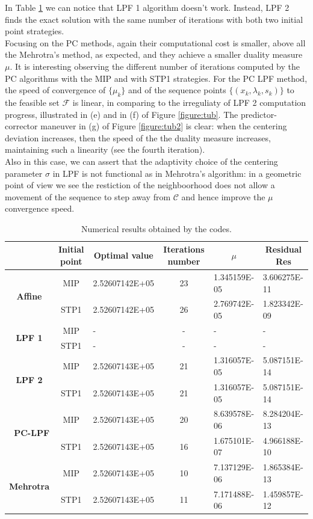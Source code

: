 \documentclass[a4paper,10 pt,titlepage,twoside]{book}
\theoremstyle{plain}
\theoremstyle{definition}
\theoremstyle{remark}
\begin{document}
In Table \ref{table:TP} we can notice that LPF 1 algorithm doesn't work. Instead, LPF 2 finds the exact solution with the same number of iterations with both two initial point strategies. \\
Focusing on the PC methods, again their computational cost is smaller, above all the Mehrotra's method, as expected, and they achieve a smaller duality measure $\mu$. It is interesting observing the different number of iterations computed by the PC algorithms with the MIP and with STP1 strategies. For the PC LPF method, the speed of convergence of $\{\mu_{k}\}$ and of the sequence points $\{(x_{k},\lambda_{k},s_{k})\}$ to the feasible set $\mathcal{F}$ is linear, in comparing to the irreguliaty of LPF 2 computation progress, illustrated in (e) and in (f) of Figure \ref{figure:tub}.
The predictor-corrector maneuver in (g) of Figure \ref{figure:tub2} is clear: when the centering deviation increases, then the speed of the the duality measure increases, maintaining such a linearity (see the fourth iteration).\\
Also in this case, we can assert that the adaptivity choice of the centering parameter $\sigma$ in LPF is not functional as in Mehrotra's algorithm: in a geometric point of view we see the restiction of the neighboorhood does not allow a movement of the sequence to step away from $\mathcal{C}$ and hence improve the $\mu$ convergence speed.
\begin{table}[]\caption{\label{table:TP}Numerical results obtained by the codes.}
	\begin{tabular}{cclcll}
		\hline		\textbf{} & \textbf{Initial point} & \multicolumn{1}{c}{\textbf{Optimal value}} & \textbf{Iterations number} & \multicolumn{1}{c}{\textbf{$\mu$}} & \multicolumn{1}{c}{\textbf{Residual} Res} \\ \hline
		\multicolumn{1}{c|}{\multirow{2}{*}{\textbf{Affine}}} & MIP & 2.52607142E+05 & 23 & 1.345159E-05 & 3.606275E-11 \\
		\multicolumn{1}{c|}{} & STP1 & 2.52607142E+05 & 26 & 2.769742E-05 & 1.823342E-09 \\ \hline
		\multicolumn{1}{c|}{\multirow{2}{*}{\textbf{LPF 1}}} & MIP & - & - & - & - \\
		\multicolumn{1}{c|}{} & STP1 & - & - & - & - \\ \hline
		\multicolumn{1}{c|}{\multirow{2}{*}{\textbf{LPF 2}}} & MIP & 2.52607143E+05 & 21 & 1.316057E-05 & 5.087151E-14 \\
		\multicolumn{1}{c|}{} & STP1 & 2.52607143E+05 & 21 & 1.316057E-05 & 5.087151E-14 \\ \hline
		\multicolumn{1}{r|}{\multirow{2}{*}{\textbf{PC-LPF}}} & MIP & 2.52607143E+05 & 20 & 8.639578E-06 & 8.284204E-13 \\
		\multicolumn{1}{r|}{} & STP1 & 2.52607143E+05 & 16 & 1.675101E-07 & 4.966188E-10 \\ \hline
		\multicolumn{1}{c|}{\multirow{2}{*}{\textbf{Mehrotra}}} & MIP & 2.52607143E+05 & 10 & 7.137129E-06 & 1.865384E-13 \\
		\multicolumn{1}{c|}{} & STP1 & 2.52607143E+05 & 11 & 7.171488E-06 & 1.459857E-12 \\ \hline
	\end{tabular}
\end{table}
\end{document}
